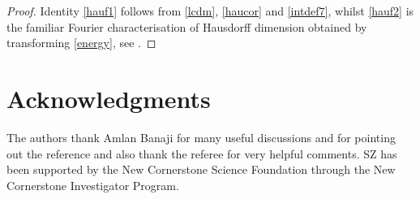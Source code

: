 \documentclass[12pt]{article}
\newcommand{\1}{{\bf 1}}
\begin{document}
\begin{proof}
Identity \eqref{hauf1} follows from  \eqref{lcdm}, \eqref{haucor} and \eqref{intdef7}, whilst \eqref{hauf2} is the familiar Fourier characterisation of Hausdorff dimension obtained by transforming \eqref{energy}, see \cite{Mat, Mat2}.
\end{proof}

\section*{Acknowledgments}
The authors thank Amlan Banaji for many useful discussions and for pointing out the reference \cite{FNW} and also thank the referee for very helpful comments. SZ has been supported by the New Cornerstone Science Foundation through the New Cornerstone Investigator Program. 



\end{document}

